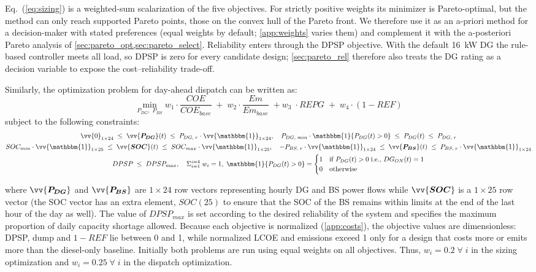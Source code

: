 \documentclass[final,3p,times]{elsarticle}
\begin{document}
Eq.~(\ref{eq:sizing}) is a weighted-sum scalarization of the five objectives. For strictly positive weights its minimizer is Pareto-optimal, but the method can only reach supported Pareto points, those on the convex hull of the Pareto front. We therefore use it as an a-priori method for a decision-maker with stated preferences (equal weights by default; \cref{app:weights} varies them) and complement it with the a-posteriori Pareto analysis of \cref{sec:pareto_opt,sec:pareto_select}. Reliability enters through the DPSP objective. With the default 16~kW DG the rule-based controller meets all load, so DPSP is zero for every candidate design; \cref{sec:pareto_rel} therefore also treats the DG rating as a decision variable to expose the cost--reliability trade-off.

Similarly, the optimization problem for day-ahead dispatch can be written as:
\begin{equation}
    \label{eq:dispatch}
    \min_{P_{DG}, \; P_{BS}} w_1 \cdot \frac{COE}{COE_{base}} \; + \; w_2 \cdot \frac{Em}{Em_{base}} \; + w_3 \; \cdot REPG \; + \; w_4 \cdot (1-REF)
\end{equation}
subject to the following constraints:
\begin{gather*}
\vv{0}_{1\times24} \; \leq \; \vv{\bm{P_{DG}}}(t) \; \leq \; P_{DG,\;r}\cdot \vv{\mathbbm{1}}_{1\times24}, \quad P_{DG,\;min} \cdot \mathbbm{1}\{P_{DG}(t) > 0\} \; \leq \; P_{DG}(t) \; \leq \; P_{DG,\;r} \\
SOC_{min}\cdot \vv{\mathbbm{1}}_{1\times25} \; \leq \;\vv{\bm{SOC}}(t) \;\leq\; SOC_{max}\cdot \vv{\mathbbm{1}}_{1\times25}, \quad -P_{BS,\;r}\cdot \vv{\mathbbm{1}}_{1\times24} \;\leq \;\vv{\bm{P_{BS}}}(t) \; \leq \; P_{BS,\;r}\cdot \vv{\mathbbm{1}}_{1\times24} \\
DPSP \; \leq \;DPSP_{max}, \quad \Sigma_{i=1}^{i=4} \; w_i  = 1, \; \mathbbm{1}\{P_{DG}(t) > 0\} = 
\begin{cases} 
    1 & \text{if } P_{DG}(t) > 0 \; \text{i.e., } DG_{ON}(t) = 1\\
    0 & \text{otherwise}
\end{cases} 
\end{gather*}

where $\vv{\bm{P_{DG}}}$ and $\vv{\bm{P_{BS}}}$ are $1\times24$ row vectors representing hourly DG and BS power flows while $\vv{\bm{SOC}}$ is a $1\times25$ row vector (the SOC vector has an extra element, $SOC(25)$ to ensure that the SOC of the BS remains within limits at the end of the last hour of the day as well). The value of $DPSP_{max}$ is set according to the desired reliability of the system and specifies the maximum proportion of daily capacity shortage allowed. Because each objective is normalized (\cref{app:costs}), the objective values are dimensionless: DPSP, dump and $1-REF$ lie between 0 and 1, while normalized LCOE and emissions exceed 1 only for a design that costs more or emits more than the diesel-only baseline. Initially both problems are run using equal weights on all objectives. Thus, $w_i = 0.2 \; \forall \; i$ in the sizing optimization and $w_i = 0.25 \; \forall \; i$ in the dispatch optimization. 
\end{document}
